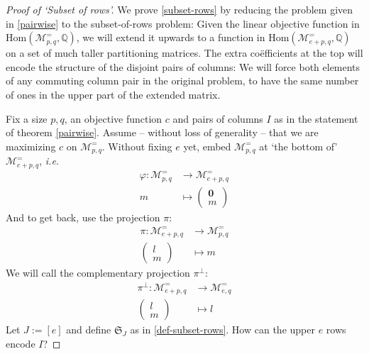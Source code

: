 \documentclass[a4paper]{amsart}
\theoremstyle{lemma}
\theoremstyle{definition}
\theoremstyle{remark}
\def\ie{\emph{i.e.}}
\newcommand{\lr}[1]{\ensuremath{\left( #1 \right)}}
\newcommand{\lrE}[1]{\ensuremath{\left[ #1 \right]}}
\newcommand{\rationals}{\ensuremath{\mathbb{Q}}}
\newcommand{\Hom}{\ensuremath{\mathrm{Hom}}}
\newcommand{\M}{\ensuremath{\mathcal{M}}}
\newcommand{\Sym}{\ensuremath{\mathfrak{S}}}
\begin{document}
\begin{proof}[Proof of `Subset of rows']
  We prove \ref{subset-rows} by reducing the problem given in
  \ref{pairwise} to the subset-of-rows problem: Given the linear
  objective function in \(\Hom \lr{\M^=_{p, q}, \rationals} \), we
  will extend it upwards to a function in \(\Hom \lr{\M^=_{e+p, q},
    \rationals}\) on a set of much taller partitioning matrices.  The
  extra co\"efficients at the top will encode the structure of the
  disjoint pairs of columns: We will force both elements of any
  commuting column pair in the original problem, to have the same
  number of ones in the upper part of the extended matrix.

  Fix a size \(p, q\), an objective function \(c\) and pairs of
  columns \(I\) as in the statement of theorem \ref{pairwise}.  Assume
  -- without loss of generality -- that we are maximizing \(c\) on
  \(\M^=_{p,q}\).  Without fixing \(e\) yet, embed \(\M^=_{p,q}\) at
  `the bottom of' \(\M^=_{e+p,q}\), \ie
  \begin{align}
    \varphi \colon \M^=_{p,q} & \to \M^=_{e+p,q} \\
    \nonumber
     m & \mapsto \lr{\begin{matrix}
       \mathbf{0} \\
       m
     \end{matrix}}
 \end{align}
 And to get back, use the projection \(\pi\):
 \begin{align}
   \pi \colon \M^=_{e+p,q} & \to \M^=_{p,q} \\
    \nonumber
     \lr{\begin{matrix}
         l \\
         m
     \end{matrix}} & \mapsto m
  \end{align}
  We will call the complementary projection \(\pi^\bot\):
  \begin{align}
    \pi^\bot \colon \M^=_{e+p,q} & \to \M^=_{e,q} \\
    \nonumber
    \lr{\begin{matrix}
        l \\
        m
      \end{matrix}} & \mapsto l
  \end{align}
  Let \(J := \lrE{e}\) and define \(\Sym_{J}\) as in
  \ref{def-subset-rows}.  How can the upper \(e\) rows encode \(I\)?
  

\end{proof}
\end{document}
